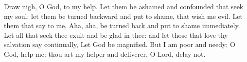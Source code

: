 
Draw nigh, O God, to my help. Let them be ashamed and confounded that seek my soul: let them be turned backward and put to shame, that wish me evil. Let them that say to me, Aha, aha, be turned back and put to shame immediately. Let all that seek thee exult and be glad in thee: and let those that love thy salvation say continually, Let God be magnified. But I am poor and needy; O God, help me: thou art my helper and deliverer, O Lord, delay not.